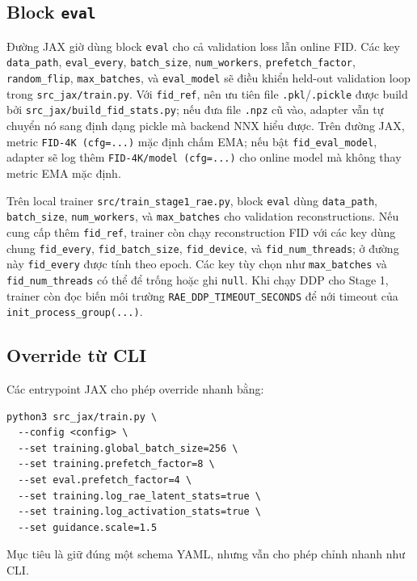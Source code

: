 \subsection{Block \texttt{eval}}

Đường JAX giờ dùng block \texttt{eval} cho cả validation loss lẫn online FID.
Các key \texttt{data\_path}, \texttt{eval\_every}, \texttt{batch\_size},
\texttt{num\_workers}, \texttt{prefetch\_factor}, \texttt{random\_flip},
\texttt{max\_batches}, và \texttt{eval\_model} sẽ điều khiển held-out validation loop trong
\texttt{src\_jax/train.py}. Với
\texttt{fid\_ref}, nên ưu tiên file \texttt{.pkl}/\texttt{.pickle} được build
bởi \texttt{src\_jax/build\_fid\_stats.py}; nếu đưa file \texttt{.npz} cũ vào,
adapter vẫn tự chuyển nó sang định dạng pickle mà backend NNX hiểu được.
Trên đường JAX, metric \texttt{FID-4K (cfg=...)} mặc định chấm EMA; nếu bật
\texttt{fid\_eval\_model}, adapter sẽ log thêm
\texttt{FID-4K/model (cfg=...)} cho online model mà không thay metric EMA mặc
định.

Trên local trainer \texttt{src/train\_stage1\_rae.py}, block \texttt{eval} dùng
\texttt{data\_path}, \texttt{batch\_size}, \texttt{num\_workers}, và
\texttt{max\_batches} cho validation reconstructions. Nếu cung cấp thêm
\texttt{fid\_ref}, trainer còn chạy reconstruction FID với các key dùng chung
\texttt{fid\_every}, \texttt{fid\_batch\_size}, \texttt{fid\_device}, và
\texttt{fid\_num\_threads}; ở đường này \texttt{fid\_every} được tính theo epoch.
Các key tùy chọn như \texttt{max\_batches} và \texttt{fid\_num\_threads} có thể
để trống hoặc ghi \texttt{null}.
Khi chạy DDP cho Stage 1, trainer còn đọc biến môi trường
\texttt{RAE\_DDP\_TIMEOUT\_SECONDS} để nới timeout của
\texttt{init\_process\_group(...)}.

\subsection{Override từ CLI}

Các entrypoint JAX cho phép override nhanh bằng:

\begin{lstlisting}[style=rae]
python3 src_jax/train.py \
  --config <config> \
  --set training.global_batch_size=256 \
  --set training.prefetch_factor=8 \
  --set eval.prefetch_factor=4 \
  --set training.log_rae_latent_stats=true \
  --set training.log_activation_stats=true \
  --set guidance.scale=1.5
\end{lstlisting}

Mục tiêu là giữ đúng một schema YAML, nhưng vẫn cho phép chỉnh nhanh như CLI.
